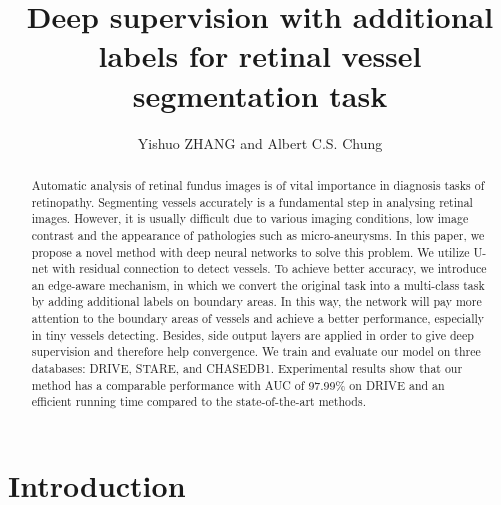 \documentclass[runningheads,a4paper]{llncs}
\begin{document}
\mainmatter

\title{Deep supervision with additional labels for retinal vessel segmentation task}


\author{Yishuo ZHANG and Albert C.S. Chung}




\tocauthor{}
\maketitle

\begin{abstract}
Automatic analysis of retinal fundus images is of vital importance in diagnosis tasks of retinopathy. Segmenting vessels accurately is a fundamental step in analysing retinal images. However, it is usually difficult due to various imaging conditions, low image contrast and the appearance of pathologies such as micro-aneurysms. In this paper, we propose a novel method with deep neural networks to solve this problem. We utilize U-net with residual connection to detect vessels. To achieve better accuracy, we introduce an edge-aware mechanism, in which we convert the original task into a multi-class task by adding additional labels on boundary areas. In this way, the network will pay more attention to the boundary areas of vessels and achieve a better performance, especially in tiny vessels detecting. Besides, side output layers are applied in order to give deep supervision and therefore help convergence. We train and evaluate our model on three databases: DRIVE, STARE, and CHASEDB1. Experimental results show that our method has a comparable performance with AUC of 97.99\% on DRIVE and an efficient running time compared to the state-of-the-art methods.
\end{abstract}

\section{Introduction}
\end{document}
